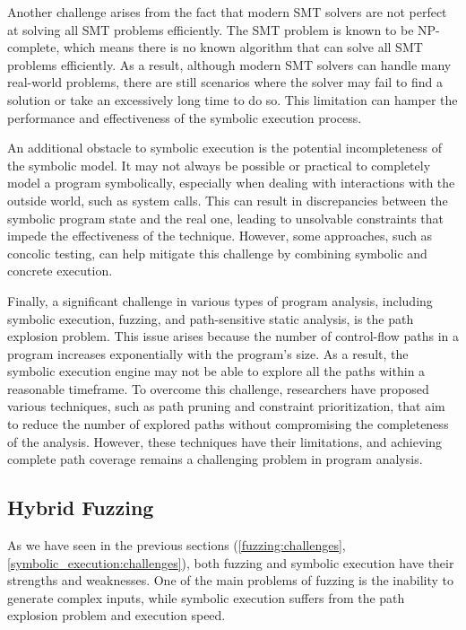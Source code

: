 Another challenge arises from the fact that modern SMT solvers are not perfect at solving all SMT problems efficiently. The SMT problem is known to be NP-complete, which means there is no known algorithm that can solve all SMT problems efficiently. As a result, although modern SMT solvers can handle many real-world problems, there are still scenarios where the solver may fail to find a solution or take an excessively long time to do so. This limitation can hamper the performance and effectiveness of the symbolic execution process.


An additional obstacle to symbolic execution is the potential incompleteness of the symbolic model. It may not always be possible or practical to completely model a program symbolically, especially when dealing with interactions with the outside world, such as system calls. This can result in discrepancies between the symbolic program state and the real one, leading to unsolvable constraints that impede the effectiveness of the technique. However, some approaches, such as concolic testing, can help mitigate this challenge by combining symbolic and concrete execution.


Finally, a significant challenge in various types of program analysis, including symbolic execution, fuzzing, and path-sensitive static analysis, is the path explosion problem. This issue arises because the number of control-flow paths in a program increases exponentially with the program's size. As a result, the symbolic execution engine may not be able to explore all the paths within a reasonable timeframe. To overcome this challenge, researchers have proposed various techniques, such as path pruning and constraint prioritization, that aim to reduce the number of explored paths without compromising the completeness of the analysis. However, these techniques have their limitations, and achieving complete path coverage remains a challenging problem in program analysis.

\subsection{Hybrid Fuzzing}

As we have seen in the previous sections (\ref{fuzzing:challenges}, \ref{symbolic_execution:challenges}), both fuzzing and symbolic execution have their strengths and weaknesses. One of the main problems of fuzzing is the inability to generate complex inputs, while symbolic execution suffers from the path explosion problem and execution speed.

